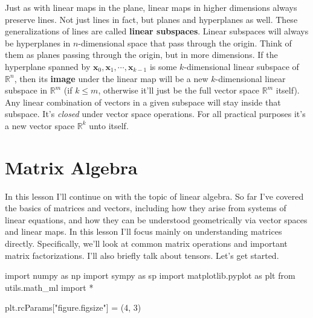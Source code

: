 \documentclass[
  letterpaper,
  DIV=11,
  numbers=noendperiod]{scrreprt}
\newenvironment{Shaded}{\begin{snugshade}}{\end{snugshade}}
\newcommand{\DecValTok}[1]{\textcolor[rgb]{0.68,0.00,0.00}{#1}}
\newcommand{\ImportTok}[1]{\textcolor[rgb]{0.00,0.46,0.62}{#1}}
\newcommand{\NormalTok}[1]{\textcolor[rgb]{0.00,0.23,0.31}{#1}}
\newcommand{\OperatorTok}[1]{\textcolor[rgb]{0.37,0.37,0.37}{#1}}
\newcommand{\StringTok}[1]{\textcolor[rgb]{0.13,0.47,0.30}{#1}}
\begin{document}
Just as with linear maps in the plane, linear maps in higher dimensions
always preserve lines. Not just lines in fact, but planes and
hyperplanes as well. These generalizations of lines are called
\textbf{linear subspaces}. Linear subspaces will always be hyperplanes
in \(n\)-dimensional space that pass through the origin. Think of them
as planes passing through the origin, but in more dimensions. If the
hyperplane spanned by
\(\mathbf{x}_0, \mathbf{x}_1, \cdots, \mathbf{x}_{k-1}\) is some
\(k\)-dimensional linear subspace of \(\mathbb{R}^n\), then its
\textbf{image} under the linear map will be a new \(k\)-dimensional
linear subspace in \(\mathbb{R}^m\) (if \(k \leq m\), otherwise it'll
just be the full vector space \(\mathbb{R}^m\) itself). Any linear
combination of vectors in a given subspace will stay inside that
subspace. It's \emph{closed} under vector space operations. For all
practical purposes it's a new vector space \(\mathbb{R}^k\) unto itself.


\hypertarget{matrix-algebra}{%
\chapter{Matrix Algebra}\label{matrix-algebra}}

In this lesson I'll continue on with the topic of linear algebra. So far
I've covered the basics of matrices and vectors, including how they
arise from systems of linear equations, and how they can be understood
geometrically via vector spaces and linear maps. In this lesson I'll
focus mainly on understanding matrices directly. Specifically, we'll
look at common matrix operations and important matrix factorizations.
I'll also briefly talk about tensors. Let's get started.

\begin{Shaded}
\begin{Highlighting}[]
\ImportTok{import}\NormalTok{ numpy }\ImportTok{as}\NormalTok{ np}
\ImportTok{import}\NormalTok{ sympy }\ImportTok{as}\NormalTok{ sp}
\ImportTok{import}\NormalTok{ matplotlib.pyplot }\ImportTok{as}\NormalTok{ plt}
\ImportTok{from}\NormalTok{ utils.math\_ml }\ImportTok{import} \OperatorTok{*}

\NormalTok{plt.rcParams[}\StringTok{"figure.figsize"}\NormalTok{] }\OperatorTok{=}\NormalTok{ (}\DecValTok{4}\NormalTok{, }\DecValTok{3}\NormalTok{)}
\end{Highlighting}
\end{Shaded}
\end{document}
